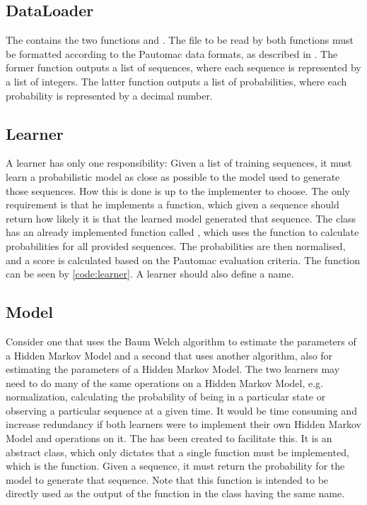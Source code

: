 \subsection{DataLoader}
The  contains the two functions  and . The file to be read by both functions must be formatted according to the Pautomac data formats, as described in . The former function outputs a list of sequences, where each sequence is represented by a list of integers.
The latter function outputs a list of probabilities, where each probability is represented by a decimal number.

\subsection{Learner}
A learner has only one responsibility: Given a list of training sequences, it must learn a probabilistic model as close as possible to the model used to generate those sequences. How this is done is up to the implementer to choose. The only requirement is that he implements a  function, which given a sequence should return how likely it is that the learned model generated that sequence.
The  class has an already implemented function called , which uses the  function to calculate probabilities for all provided sequences.
The probabilities are then normalised, and a score is calculated based on the Pautomac evaluation criteria.
The  function can be seen by \ref{code:learner}.
A learner should also define a name.

\subsection{Model}
Consider one  that uses the Baum Welch algorithm to estimate the parameters of a Hidden Markov Model and a second  that uses another algorithm, also for estimating the parameters of a Hidden Markov Model. The two learners may need to do many of the same operations on a Hidden Markov Model, e.g. normalization, calculating the probability of being in a particular state or observing a particular sequence at a given time. 
It would be time consuming and increase redundancy if both learners were to implement their own Hidden Markov Model and operations on it.
The  has been created to facilitate this. It is an abstract class, which only dictates that a single function must be implemented, which is the  function. Given a sequence, it must return the probability for the model to generate that sequence. Note that this function is intended to be directly used as the output of the function in the  class having the same name.

